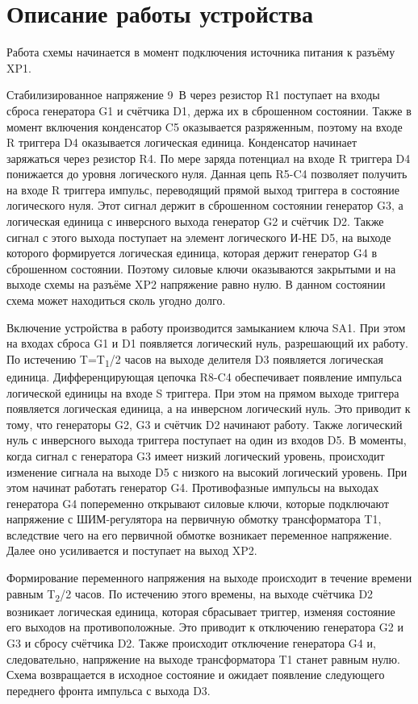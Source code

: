 \section{Описание работы устройства}

Работа схемы начинается в момент подключения источника питания к разъёму XP1. 

Стабилизированное напряжение 9~В через резистор R1 поступает на входы сброса генератора G1 и  счётчика D1, держа их в сброшенном состоянии. Также в момент включения конденсатор C5 оказывается разряженным, поэтому на входе R триггера D4 оказывается логическая единица. Конденсатор начинает заряжаться через резистор R4. По мере заряда потенциал на входе R триггера D4 понижается до уровня логического нуля. Данная цепь R5-C4 позволяет получить на входе R триггера импульс, переводящий прямой выход триггера в состояние логического нуля. Этот сигнал держит в сброшенном состоянии генератор G3, а логическая единица с инверсного выхода \longndash генератор G2 и счётчик D2. Также сигнал с этого выхода поступает на элемент логического И-НЕ D5, на выходе которого формируется логическая единица, которая держит генератор G4 в сброшенном состоянии. Поэтому силовые ключи оказываются закрытыми и на выходе схемы на разъёме XP2 напряжение равно нулю. В данном состоянии схема может находиться сколь угодно долго.

Включение устройства в работу производится замыканием ключа SA1. При этом на входах сброса G1 и D1 появляется логический нуль, разрешающий их работу. По истечению T=T\textsubscript{1}/2 часов на выходе делителя D3 появляется логическая единица. Дифференцирующая цепочка R8-C4 обеспечивает появление импульса логической единицы на входе S триггера. При этом на прямом выходе триггера появляется логическая единица, а на инверсном \longndash логический нуль. Это приводит к тому, что генераторы G2, G3 и счётчик D2 начинают работу. Также логический нуль с инверсного выхода триггера поступает на один из входов D5. В моменты, когда сигнал с генератора G3 имеет низкий логический уровень, происходит изменение сигнала на выходе D5 с низкого на высокий логический уровень. При этом начинат работать генератор G4. Противофазные импульсы на выходах генератора G4 попеременно открывают силовые ключи, которые подключают напряжение с ШИМ-регулятора на первичную обмотку трансформатора T1, вследствие чего на его первичной обмотке возникает переменное напряжение. Далее оно усиливается и поступает на выход XP2.

Формирование переменного напряжения на выходе происходит в течение времени равным T\textsubscript{2}/2 часов. По истечению этого времены, на выходе счётчика D2 возникает логическая единица, которая сбрасывает триггер, изменяя состояние его выходов на противоположные. Это приводит к отключению генератора G2 и G3 и сбросу счётчика D2. Также происходит отключение генератора G4 и, следовательно, напряжение на выходе трансформатора T1 станет равным нулю. Схема возвращается в исходное состояние и ожидает появление следующего переднего фронта импульса с выхода D3.

